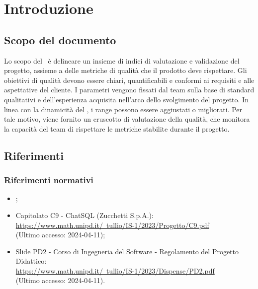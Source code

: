 \section{Introduzione}

\subsection{Scopo del documento}
\par Lo scopo del \PdQ\ è delineare un insieme di indici di valutazione e validazione del progetto, assieme a delle metriche di qualità che il prodotto deve rispettare. Gli obiettivi di qualità devono essere chiari, quantificabili e conformi ai requisiti e alle aspettative del cliente. I parametri vengono fissati dal team sulla base di standard qualitativi e dell'esperienza acquisita nell'arco dello svolgimento del progetto. In linea con la dinamicità del \PdQ, i range possono essere aggiustati o migliorati. Per tale motivo, viene fornito un cruscotto di valutazione della qualità, che monitora la capacità del team di rispettare le metriche stabilite durante il progetto.

\subsection{Riferimenti}

\subsubsection{Riferimenti normativi}
\begin{itemize}
  \item \NormeDiProgetto;
  \item Capitolato C9 - ChatSQL (Zucchetti S.p.A.): \\ \href{https://www.math.unipd.it/~tullio/IS-1/2023/Progetto/C9.pdf}{https://www.math.unipd.it/~tullio/IS-1/2023/Progetto/C9.pdf} \\ (Ultimo accesso: 2024-04-11);
  \item Slide PD2 - Corso di Ingegneria del Software - Regolamento del Progetto Didattico: \\ \href{https://www.math.unipd.it/~tullio/IS-1/2023/Dispense/PD2.pdf}{https://www.math.unipd.it/~tullio/IS-1/2023/Dispense/PD2.pdf} \\ (Ultimo accesso: 2024-04-11).
\end{itemize}

